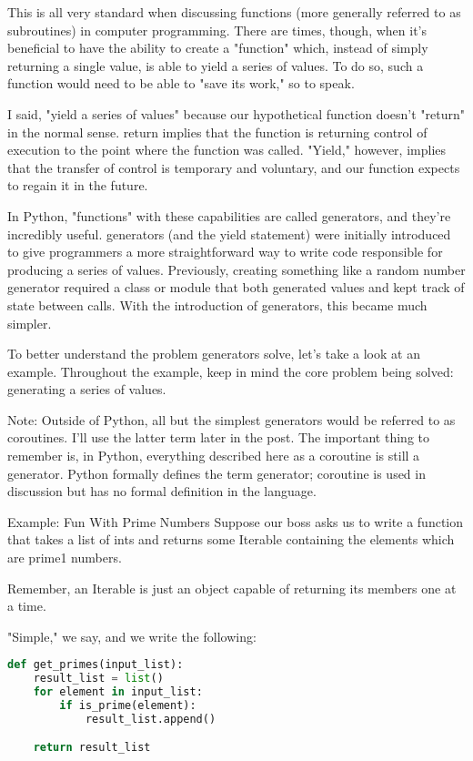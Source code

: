 This is all very standard when discussing functions (more generally referred to as subroutines) in computer programming. There are times, though, when it's beneficial to have the ability to create a "function" which, instead of simply returning a single value, is able to yield a series of values. To do so, such a function would need to be able to "save its work," so to speak.

I said, "yield a series of values" because our hypothetical function doesn't "return" in the normal sense. return implies that the function is returning control of execution to the point where the function was called. "Yield," however, implies that the transfer of control is temporary and voluntary, and our function expects to regain it in the future.

In Python, "functions" with these capabilities are called generators, and they're incredibly useful. generators (and the yield statement) were initially introduced to give programmers a more straightforward way to write code responsible for producing a series of values. Previously, creating something like a random number generator required a class or module that both generated values and kept track of state between calls. With the introduction of generators, this became much simpler.

To better understand the problem generators solve, let's take a look at an example. Throughout the example, keep in mind the core problem being solved: generating a series of values.

Note: Outside of Python, all but the simplest generators would be referred to as coroutines. I'll use the latter term later in the post. The important thing to remember is, in Python, everything described here as a coroutine is still a generator. Python formally defines the term generator; coroutine is used in discussion but has no formal definition in the language.

Example: Fun With Prime Numbers
Suppose our boss asks us to write a function that takes a list of ints and returns some Iterable containing the elements which are prime1 numbers.

Remember, an Iterable is just an object capable of returning its members one at a time.

"Simple," we say, and we write the following:

\begin{lstlisting}[language=Python]
def get_primes(input_list):
    result_list = list()
    for element in input_list:
        if is_prime(element):
            result_list.append()

    return result_list
\end{lstlisting}

